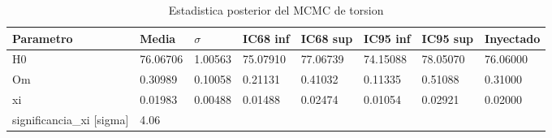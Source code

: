 \begin{table}[htbp]
  \centering
  \caption{Estadistica posterior del MCMC de torsion}
  \begin{tabular}{llllllll}
    \toprule
    Parametro & Media & $\sigma$ & IC68 inf & IC68 sup & IC95 inf & IC95 sup & Inyectado \\
    \midrule
H0 & 76.06706 & 1.00563 & 75.07910 & 77.06739 & 74.15088 & 78.05070 & 76.06000 \\
Om & 0.30989 & 0.10058 & 0.21131 & 0.41032 & 0.11335 & 0.51088 & 0.31000 \\
xi & 0.01983 & 0.00488 & 0.01488 & 0.02474 & 0.01054 & 0.02921 & 0.02000 \\
significancia_xi [sigma] & 4.06 &  &  &  &  &  &  \\
    \bottomrule
  \end{tabular}
\end{table}
